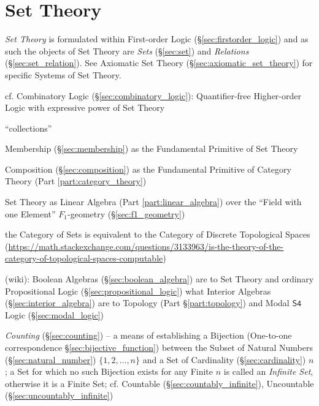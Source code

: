 \part{Set Theory}\label{part:set_theory}

\emph{Set Theory} is formulated within First-order Logic
(\S\ref{sec:firstorder_logic}) and as such the objects of Set Theory are
\emph{Sets} (\S\ref{sec:set}) and \emph{Relations} (\S\ref{sec:set_relation}).
See Axiomatic Set Theory (\S\ref{sec:axiomatic_set_theory}) for specific Systems
of Set Theory.

\fist cf. Combinatory Logic (\S\ref{sec:combinatory_logic}): Quantifier-free
Higher-order Logic with expressive power of Set Theory

``collections''

Membership (\S\ref{sec:membership}) as the Fundamental Primitive of Set
Theory

Composition (\S\ref{sec:composition}) as the Fundamental Primitive of
Category Theory (Part \ref{part:category_theory})

Set Theory as Linear Algebra (Part \ref{part:linear_algebra}) over the
``Field with one Element'' \fist $F_1$-geometry (\S\ref{sec:f1_geometry})

the Category of Sets is equivalent to the Category of Discrete Topological
Spaces
(\url{https://math.stackexchange.com/questions/3133963/is-the-theory-of-the-category-of-topological-spaces-computable})

(wiki):
Boolean Algebras (\S\ref{sec:boolean_algebra}) are to Set Theory and ordinary
Propositional Logic (\S\ref{sec:propositional_logic}) what Interior Algebras
(\S\ref{sec:interior_algebra}) are to Topology (Part \S\ref{part:topology}) and
Modal $\mathsf{S4}$ Logic (\S\ref{sec:modal_logic})

\fist \emph{Counting} (\S\ref{sec:counting}) -- a means of establishing a
Bijection (One-to-one correspondence \S\ref{sec:bijective_function}) between the
Subset of Natural Numbers (\S\ref{sec:natural_number}) $\{1,2,\ldots,n\}$ and a
Set of Cardinality (\S\ref{sec:cardinality}) $n$; a Set for which no such
Bijection exists for any Finite $n$ is called an \emph{Infinite Set}, otherwise
it is a Finite Set;
cf. Countable (\S\ref{sec:countably_infinite}), Uncountable
(\S\ref{sec:uncountably_infinite})

